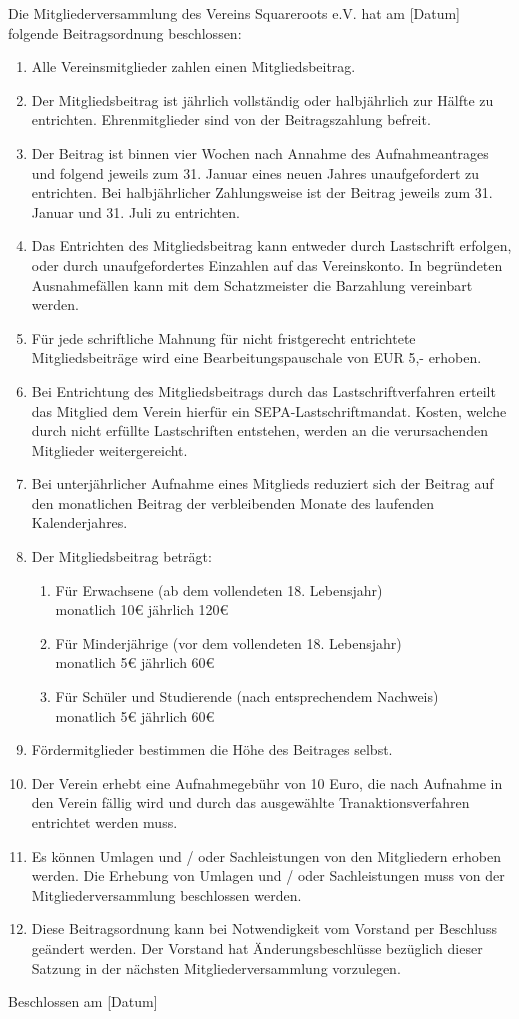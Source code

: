 \documentclass[a4paper,ngerman]{scrartcl}
\begin{document}
Die Mitgliederversammlung des Vereins Squareroots e.V. hat am [Datum] folgende Beitragsordnung beschlossen:

\begin{enumerate}
\item Alle Vereinsmitglieder zahlen einen Mitgliedsbeitrag.
\item Der Mitgliedsbeitrag ist jährlich vollständig oder halbjährlich zur Hälfte zu entrichten. Ehrenmitglieder sind von der Beitragszahlung befreit.
\item Der Beitrag ist binnen vier Wochen nach Annahme des Aufnahmeantrages und folgend jeweils zum 31. Januar eines neuen Jahres unaufgefordert zu entrichten. Bei halbjährlicher Zahlungsweise ist der Beitrag jeweils zum 31. Januar und 31. Juli zu entrichten.
\item Das Entrichten des Mitgliedsbeitrag kann entweder durch Lastschrift erfolgen, oder durch unaufgefordertes Einzahlen auf das Vereinskonto. In begründeten Ausnahmefällen kann mit dem Schatzmeister die Barzahlung vereinbart werden.
\item Für jede schriftliche Mahnung für nicht fristgerecht entrichtete Mitgliedsbeiträge wird eine Bearbeitungspauschale von EUR 5,- erhoben.
\item Bei Entrichtung des Mitgliedsbeitrags durch das Lastschriftverfahren erteilt das Mitglied dem Verein hierfür ein SEPA-Lastschriftmandat. Kosten, welche durch nicht erfüllte Lastschriften entstehen, werden an die verursachenden Mitglieder weitergereicht.
\item Bei unterjährlicher Aufnahme eines Mitglieds reduziert sich der Beitrag auf den monatlichen Beitrag der verbleibenden Monate des laufenden Kalenderjahres.
\item Der Mitgliedsbeitrag beträgt:
\begin{enumerate}
\item Für Erwachsene (ab dem vollendeten 18. Lebensjahr)\\
monatlich 10€          jährlich 120€
\item Für Minderjährige (vor dem vollendeten 18. Lebensjahr)\\
monatlich 5€            jährlich 60€
\item Für Schüler und Studierende (nach entsprechendem Nachweis)\\
monatlich 5€            jährlich 60€
\end{enumerate}
\item Fördermitglieder bestimmen die Höhe des Beitrages selbst.
\item Der Verein erhebt eine Aufnahmegebühr von 10 Euro, die nach Aufnahme in den Verein fällig wird und durch das ausgewählte Tranaktionsverfahren entrichtet werden muss.
\item Es können Umlagen und / oder Sachleistungen von den Mitgliedern erhoben werden. Die Erhebung von Umlagen und / oder Sachleistungen muss von der Mitgliederversammlung beschlossen werden.
\item Diese Beitragsordnung kann bei Notwendigkeit vom Vorstand per Beschluss geändert werden. Der Vorstand hat Änderungsbeschlüsse bezüglich dieser Satzung in der nächsten Mitgliederversammlung vorzulegen.
\end{enumerate}


Beschlossen am [Datum]
\end{document}
